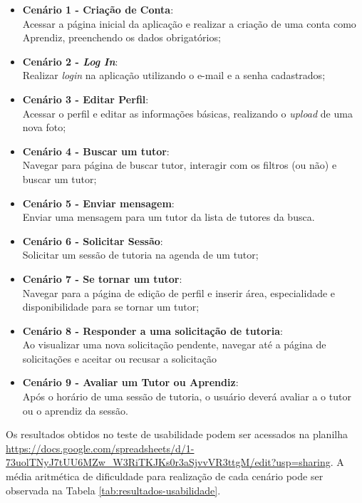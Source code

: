 \begin{itemize}[label=\textbullet]
    \item \textbf{Cenário 1 - Criação de Conta}:\\Acessar a página inicial da aplicação e realizar a criação de uma conta como Aprendiz, preenchendo os dados obrigatórios;
    \item \textbf{Cenário 2 - \textit{Log In}}:\\Realizar \textit{login} na aplicação utilizando o e-mail e a senha cadastrados;
    \item \textbf{Cenário 3 - Editar Perfil}:\\Acessar o perfil e editar as informações básicas, realizando o \textit{upload} de uma nova foto;
    \item \textbf{Cenário 4 - Buscar um tutor}:\\Navegar para página de buscar tutor, interagir com os filtros (ou não) e buscar um tutor;
    \item \textbf{Cenário 5 - Enviar mensagem}:\\Enviar uma mensagem para um tutor da lista de tutores da busca.
    \item \textbf{Cenário 6 - Solicitar Sessão}:\\Solicitar um sessão de tutoria na agenda de um tutor;
    \item \textbf{Cenário 7 - Se tornar um tutor}:\\Navegar para a página de edição de perfil e inserir área, especialidade e disponibilidade para se tornar um tutor;
    \item \textbf{Cenário 8 - Responder a uma solicitação de tutoria}:\\Ao visualizar uma nova solicitação pendente, navegar até a página de solicitações e aceitar ou recusar a solicitação
    \item \textbf{Cenário 9 - Avaliar um Tutor ou Aprendiz}:\\Após o horário de uma sessão de tutoria, o usuário deverá avaliar a o tutor ou o aprendiz da sessão.
\end{itemize}

Os resultados obtidos no teste de usabilidade podem ser acessados na planilha \url{https://docs.google.com/spreadsheets/d/1-73uolTNyJ7tUU6MZw_W3RiTKJKs0r3aSjvvVR3ttgM/edit?usp=sharing}. A média aritmética de dificuldade para realização de cada cenário pode ser observada na Tabela \ref{tab:resultados-usabilidade}.


